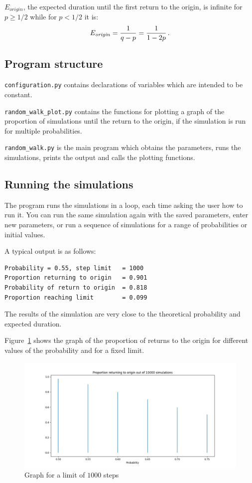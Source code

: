 $E_{\mathit{origin}}$, the expected duration until the first return to the origin, is infinite for $p\geq 1/2$ while for $p<1/2$ it is:
\[
E_{\mathit{origin}}=\displaystyle\frac{1}{q-p}=\displaystyle\frac{1}{1-2p}\,.
\]

\subsection{Program structure}

\verb+configuration.py+ contains declarations of variables which are intended to be constant.

\verb+random_walk_plot.py+ contains the functions for plotting a graph of the proportion of simulations until the return to the origin, if the simulation is run for multiple probabilities.

\verb+random_walk.py+ is the main program which obtains the parameters, runs the simulations, prints the output and calls the plotting functions.

\subsection{Running the simulations}

The program runs the simulations in a loop, each time asking the user how to run it. You can run the same simulation again with the saved parameters, enter new parameters, or run a sequence of simulations for a range of probabilities or initial values.

A typical output is as follows:
\begin{verbatim}
Probability = 0.55, step limit   = 1000
Proportion returning to origin   = 0.901
Probability of return to origin  = 0.818
Proportion reaching limit        = 0.099
\end{verbatim}
The results of the simulation are very close to the theoretical probability and expected duration.

Figure~\ref{f.random_walk-01} shows the graph of the proportion of returns to the origin for different values of the probability and for a fixed limit.
\begin{figure}
\begin{center}
\includegraphics[width=\textwidth]{random_walk-01}
\end{center}
\caption{Graph for a limit of $1000$ steps}\label{f.random_walk-01}
\end{figure}

